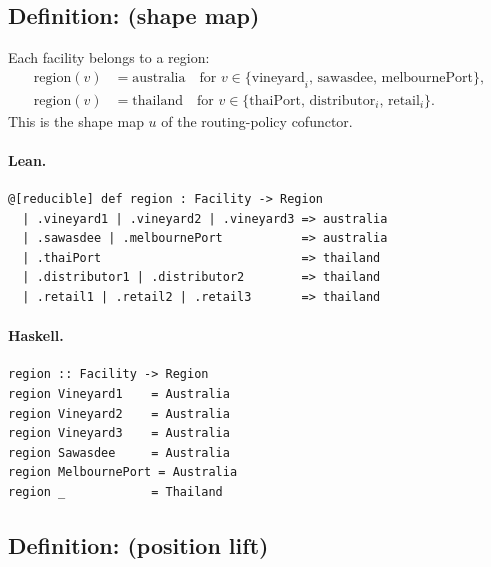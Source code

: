 \documentclass[11pt,a4paper]{article}
\begin{document}
\subsection{Definition:  (shape map)}

\begin{defn}
Each facility belongs to a region:
\begin{align*}
  \mathrm{region}(v) &= \mathrm{australia} \quad
    \text{for } v \in \{\mathrm{vineyard}_i,\, \mathrm{sawasdee},\, \mathrm{melbournePort}\}, \\
  \mathrm{region}(v) &= \mathrm{thailand} \quad
    \text{for } v \in \{\mathrm{thaiPort},\, \mathrm{distributor}_i,\, \mathrm{retail}_i\}.
\end{align*}
This is the shape map $u$ of the routing-policy cofunctor.
\end{defn}

\paragraph{Lean.}
\begin{lstlisting}[style=lean]
@[reducible] def region : Facility -> Region
  | .vineyard1 | .vineyard2 | .vineyard3 => australia
  | .sawasdee | .melbournePort           => australia
  | .thaiPort                            => thailand
  | .distributor1 | .distributor2        => thailand
  | .retail1 | .retail2 | .retail3       => thailand
\end{lstlisting}

\paragraph{Haskell.}
\begin{lstlisting}[style=haskell]
region :: Facility -> Region
region Vineyard1    = Australia
region Vineyard2    = Australia
region Vineyard3    = Australia
region Sawasdee     = Australia
region MelbournePort = Australia
region _            = Thailand
\end{lstlisting}


\subsection{Definition:  (position lift)}
\end{document}
